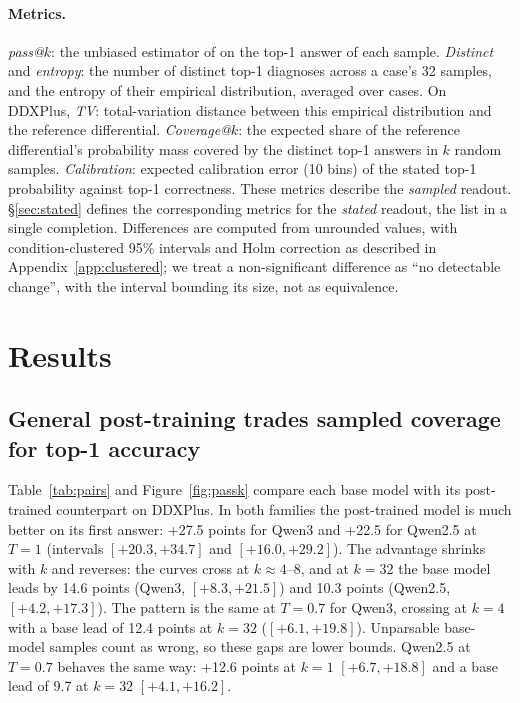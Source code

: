 \documentclass[11pt]{article}
\begin{document}
\paragraph{Metrics.}
\emph{pass@$k$}: the unbiased estimator of \citet{chen2021codex} on the top-1 answer of each sample.
\emph{Distinct} and \emph{entropy}: the number of distinct top-1 diagnoses across a case's 32 samples, and the entropy of their empirical distribution, averaged over cases.
On DDXPlus, \emph{TV}: total-variation distance between this empirical distribution and the reference differential.
\emph{Coverage@$k$}: the expected share of the reference differential's probability mass covered by the distinct top-1 answers in $k$ random samples.
\emph{Calibration}: expected calibration error (10 bins) of the stated top-1 probability against top-1 correctness.
These metrics describe the \emph{sampled} readout. \S\ref{sec:stated} defines the corresponding metrics for the \emph{stated} readout, the list in a single completion.
Differences are computed from unrounded values, with condition-clustered 95\% intervals and Holm correction as described in Appendix~\ref{app:clustered}; we treat a non-significant difference as ``no detectable change'', with the interval bounding its size, not as equivalence.

\section{Results}

\subsection{General post-training trades sampled coverage for top-1 accuracy}\label{sec:general}
Table~\ref{tab:pairs} and Figure~\ref{fig:passk} compare each base model with its post-trained counterpart on DDXPlus.
In both families the post-trained model is much better on its first answer: +27.5 points for Qwen3 and +22.5 for Qwen2.5 at $T{=}1$ (intervals $[+20.3,+34.7]$ and $[+16.0,+29.2]$).
The advantage shrinks with $k$ and reverses: the curves cross at $k{\approx}4$--8, and at $k{=}32$ the base model leads by 14.6 points (Qwen3, $[+8.3,+21.5]$) and 10.3 points (Qwen2.5, $[+4.2,+17.3]$).
The pattern is the same at $T{=}0.7$ for Qwen3, crossing at $k{=}4$ with a base lead of 12.4 points at $k{=}32$ ($[+6.1,+19.8]$).
Unparsable base-model samples count as wrong, so these gaps are lower bounds.
Qwen2.5 at $T{=}0.7$ behaves the same way: +12.6 points at $k{=}1$ $[+6.7,+18.8]$ and a base lead of 9.7 at $k{=}32$ $[+4.1,+16.2]$.
\end{document}
